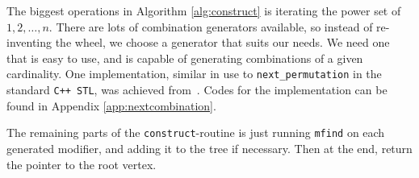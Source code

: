 The biggest operations in Algorithm \ref{alg:construct} is iterating the power
set of ${1,2,\ldots,n}$. There are lots of combination generators available, so
instead of re-inventing the wheel, we choose a generator that suits our needs.
We need one that is easy to use, and is capable of generating combinations of
a given cardinality. One implementation, similar in use to
\texttt{next\_permutation} in the standard \texttt{C++ STL}, was
achieved from~\cite{codeproject}.
Codes for the implementation can be found in Appendix
\ref{app:nextcombination}.

The remaining parts of the \texttt{construct}-routine is just running
\texttt{mfind} on each generated modifier, and adding it to the tree
if necessary. Then at the end, return the pointer to the root vertex.
